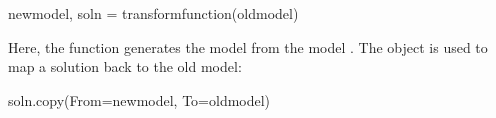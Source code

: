 \documentclass[letterpaper,10pt,english]{sphinxmanual}
\begin{document}
\begin{sphinxVerbatim}[commandchars=\\\{\}]
\PYGZgt{}\PYGZgt{}\PYGZgt{} new\PYGZus{}model, soln = transform\PYGZus{}function(old\PYGZus{}model)
\end{sphinxVerbatim}

Here, the function  generates the model  from the model .  The
object  is used to map a solution back to the old model:

\begin{sphinxVerbatim}[commandchars=\\\{\}]
\PYGZgt{}\PYGZgt{}\PYGZgt{} soln.copy(From=new\PYGZus{}model, To=old\PYGZus{}model)
\end{sphinxVerbatim}
\end{document}
